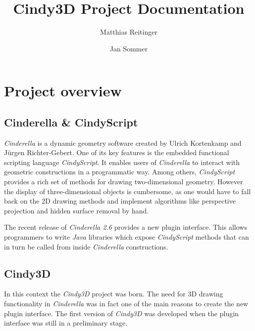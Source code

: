 \documentclass{scrreprt}
\title{Cindy3D Project Documentation}
\author{Matthias Reitinger \and Jan Sommer}
\begin{document}
\maketitle

\newpage

\tableofcontents

\newpage

\chapter{Project overview}

\section{Cinderella \& CindyScript}

\emph{Cinderella} is a dynamic geometry software created by Ulrich Kortenkamp and Jürgen Richter-Gebert. One of its key features is the embedded functional scripting language \emph{CindyScript}. It enables users of \emph{Cinderella} to interact with geometric constructions in a programmatic way. Among others, \emph{CindyScript} provides a rich set of methods for drawing two-dimensional geometry. However the display of three-dimensional objects is cumbersome, as one would have to fall back on the 2D drawing methods and implement algorithms like perspective projection and hidden surface removal by hand.

The recent release of \emph{Cinderella 2.6} provides a new plugin interface. This allows programmers to write \emph{Java} libraries which expose \emph{CindyScript} methods that can in turn be called from inside \emph{Cinderella} constructions.

\section{Cindy3D}

In this context the \emph{Cindy3D} project was born. The need for 3D drawing 
functionality in \emph{Cinderella} was in fact one of the main reasons to 
create the new plugin interface. The first version of \emph{Cindy3D} was 
developed when the plugin interface was still in a preliminary stage.
\end{document}
